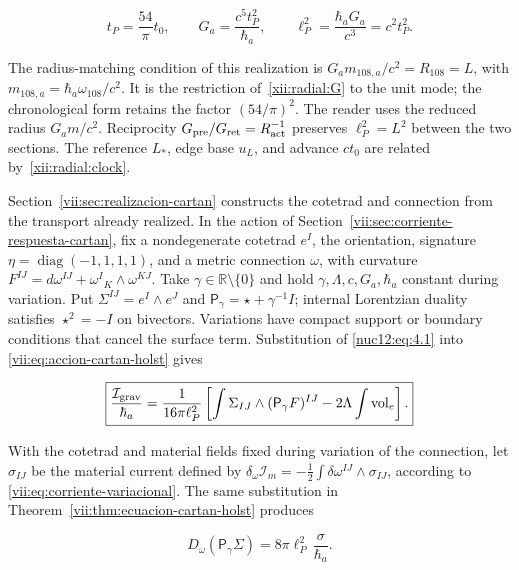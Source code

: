 \begin{equation}
t_P=\frac{54}{\pi}t_0,\qquad
G_a=\frac{c^5t_P^2}{\hbar_a},\qquad
\ell_P^2=\frac{\hbar_aG_a}{c^3}=c^2t_P^2.
\label{nuc12:eq:4.1}
\end{equation}

The radius-matching condition of this realization is \(G_a m_{108,a}/c^2=R_{108}=L\), with \(m_{108,a}=\hbar_a\omega_{108}/c^2\). It is the restriction of~\eqref{xii:radial:G} to the unit mode; the chronological form retains the factor \((54/\pi)^2\). The reader uses the reduced radius \(G_a m/c^2\). Reciprocity \(G_{\rm pre}/G_{\rm ret}=R_{\rm act}^{-1}\) preserves \(\ell_P^2=L^2\) between the two sections. The reference \(L_*\), edge base \(u_L\), and advance \(ct_0\) are related by~\eqref{xii:radial:clock}.

Section~\ref{vii:sec:realizacion-cartan} constructs the cotetrad and connection from the transport already realized. In the action of Section~\ref{vii:sec:corriente-respuesta-cartan}, fix a nondegenerate cotetrad \(e^I\), the orientation, signature \(\eta=\operatorname{diag}(-1,1,1,1)\), and a metric connection \(\omega\), with curvature \(F^{IJ}=d\omega^{IJ}+\omega^I{}_{K}\wedge\omega^{KJ}\). Take \(\gamma\in\mathbb R\setminus\{0\}\) and hold \(\gamma,\Lambda,c,G_a,\hbar_a\) constant during variation. Put \(\Sigma^{IJ}=e^I\wedge e^J\) and \(\mathsf P_\gamma=\star+\gamma^{-1}I\); internal Lorentzian duality satisfies \(\star^2=-I\) on bivectors. Variations have compact support or boundary conditions that cancel the surface term. Substitution of \eqref{nuc12:eq:4.1} into \eqref{vii:eq:accion-cartan-holst} gives

\begin{equation}
\boxed{\frac{\mathcal I_{\rm grav}}{\hbar_a}
=\frac1{16\pi\ell_P^2}
\left[\int\Sigma_{IJ}\wedge(\mathsf P_\gamma F)^{IJ}
-2\Lambda\int\operatorname{vol}_e\right].}
\label{nuc12:eq:4.2}
\end{equation}

With the cotetrad and material fields fixed during variation of the connection, let \(\sigma_{IJ}\) be the material current defined by \(\delta_\omega\mathcal I_m=-\tfrac12\int\delta\omega^{IJ}\wedge\sigma_{IJ}\), according to \eqref{vii:eq:corriente-variacional}. The same substitution in Theorem~\ref{vii:thm:ecuacion-cartan-holst} produces

\begin{equation}
D_\omega(\mathsf P_\gamma\Sigma)
=8\pi\ell_P^2\,\frac{\sigma}{\hbar_a}.
\label{nuc12:eq:4.3}
\end{equation}

